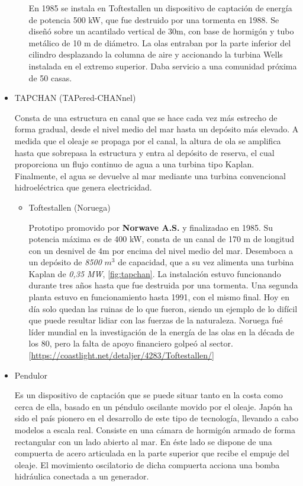 \begin{itemize}
\begin{itemize}
    En 1985 se instala en Toftestallen un dispositivo de captación de
    energía de potencia 500 kW, que fue destruido por una tormenta en
    1988. Se diseñó sobre un acantilado vertical de 30m, con base de
    hormigón y tubo metálico de 10 m de diámetro. La olas entraban por
    la parte inferior del cilindro desplazando la columna de aire y
    accionando la turbina Wells instalada en el extremo superior. Daba
    servicio a una comunidad próxima de 50 casas.
  \end{itemize}
\item
  TAPCHAN (TAPered-CHANnel)

  Consta de una estructura en canal que se hace cada vez más estrecho de
  forma gradual, desde el nivel medio del mar hasta un depósito más
  elevado. A medida que el oleaje se propaga por el canal, la altura de
  ola se amplifica hasta que sobrepasa la estructura y entra al depósito
  de reserva, el cual proporciona un flujo continuo de agua a una
  turbina tipo Kaplan. Finalmente, el agua se devuelve al mar mediante
  una turbina convencional hidroeléctrica que genera electricidad.

  \begin{itemize}
  \item
    Toftestallen (Noruega)

    Prototipo promovido por \textbf{Norwave A.S.} y finalizadao en 1985.
    Su potencia máxima es de 400 kW, consta de un canal de 170 m de
    longitud con un desnivel de 4m por encima del nivel medio del mar.
    Desemboca a un depósito de \emph{8500} \(m^3\) de capacidad, que a
    su vez alimenta una turbina Kaplan de \emph{0,35 MW}, \autoref{fig:tapchan}. La instalación
    estuvo funcionando durante tres años hasta que fue destruida por
    una tormenta. Una segunda planta estuvo en funcionamiento hasta
    1991, con el mismo final. Hoy en día solo quedan las ruinas de lo
    que fueron, siendo un ejemplo de lo difícil que puede resultar
    lidiar con las fuerzas de la naturaleza. Noruega fué líder mundial
    en la investigación de la energía de las olas en la década de los
    80, pero la falta de apoyo financiero golpeó al sector.
    {[}\url{https://coastlight.net/detaljer/4283/Toftestallen/}{]}


  \end{itemize}
\item
  Pendulor

  Es un dispositivo de captación que se puede situar tanto en la costa
  como cerca de ella, basado en un péndulo oscilante movido por el
  oleaje. Japón ha sido el país pionero en el desarrollo de este tipo de
  tecnología, llevando a cabo modelos a escala real. Consiste en una
  cámara de hormigón armado de forma rectangular con un lado abierto al
  mar. En éste lado se dispone de una compuerta de acero articulada en
  la parte superior que recibe el empuje del oleaje. El movimiento
  oscilatorio de dicha compuerta acciona una bomba hidráulica conectada
  a un generador.


\end{itemize}
